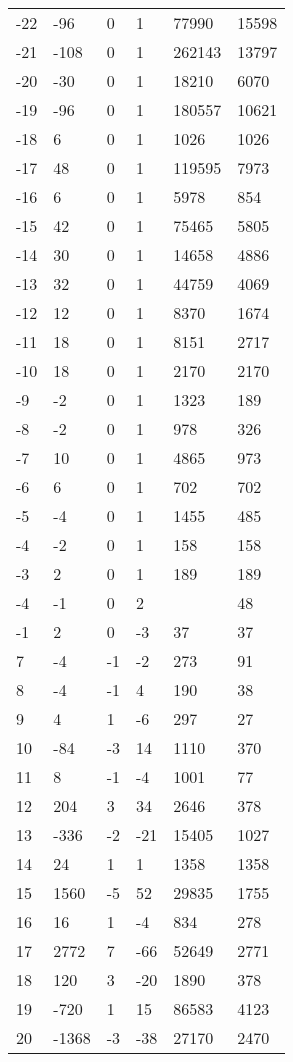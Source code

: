 \documentclass{amsart}
\begin{document}
\begin{longtable}{llllll}
-22 & -96 & 0 & 1 & 77990 & 15598\\
-21 & -108 & 0 & 1 & 262143 & 13797\\
-20 & -30 & 0 & 1 & 18210 & 6070\\
-19 & -96 & 0 & 1 & 180557 & 10621\\
-18 & 6 & 0 & 1 & 1026 & 1026\\
-17 & 48 & 0 & 1 & 119595 & 7973\\
-16 & 6 & 0 & 1 & 5978 & 854\\
-15 & 42 & 0 & 1 & 75465 & 5805\\
-14 & 30 & 0 & 1 & 14658 & 4886\\
-13 & 32 & 0 & 1 & 44759 & 4069\\
-12 & 12 & 0 & 1 & 8370 & 1674\\
-11 & 18 & 0 & 1 & 8151 & 2717\\
-10 & 18 & 0 & 1 & 2170 & 2170\\
-9 & -2 & 0 & 1 & 1323 & 189\\
-8 & -2 & 0 & 1 & 978 & 326\\
-7 & 10 & 0 & 1 & 4865 & 973\\
-6 & 6 & 0 & 1 & 702 & 702\\
-5 & -4 & 0 & 1 & 1455 & 485\\
-4 & -2 & 0 & 1 & 158 & 158\\
-3 & 2 & 0 & 1 & 189 & 189\\
-4 & -1 & 0 & 2 &  & 48\\
-1 & 2 & 0 & -3 & 37 & 37\\
7 & -4 & -1 & -2 & 273 & 91\\
8 & -4 & -1 & 4 & 190 & 38\\
9 & 4 & 1 & -6 & 297 & 27\\
10 & -84 & -3 & 14 & 1110 & 370\\
11 & 8 & -1 & -4 & 1001 & 77\\
12 & 204 & 3 & 34 & 2646 & 378\\
13 & -336 & -2 & -21 & 15405 & 1027\\
14 & 24 & 1 & 1 & 1358 & 1358\\
15 & 1560 & -5 & 52 & 29835 & 1755\\
16 & 16 & 1 & -4 & 834 & 278\\
17 & 2772 & 7 & -66 & 52649 & 2771\\
18 & 120 & 3 & -20 & 1890 & 378\\
19 & -720 & 1 & 15 & 86583 & 4123\\
20 & -1368 & -3 & -38 & 27170 & 2470\\

\end{longtable}
\end{document}
